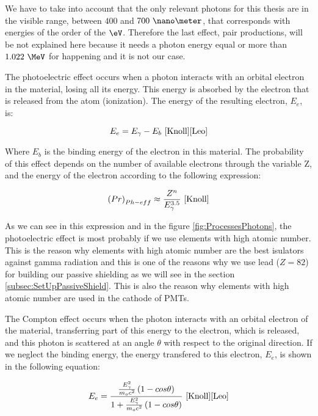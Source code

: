 We have to take into account that the only relevant photons for this thesis are in the visible range, between $400$ and $700~\nano\meter$, that corresponds with energies of the order of the $\eV$. Therefore the last effect, pair productions, will be not explained here because it needs a photon energy equal or more than $1.022~\MeV$ for happening and it is not our case.

The photoelectric effect occurs when a photon interacts with an orbital electron in the material, losing all its energy. This energy is absorbed by the electron that is released from the atom (ionization). The energy of the resulting electron, $E_e$, is:


\begin{equation}
E_e = E_\gamma - E_b ~\cite{Knoll}\cite{Leo}
\label{eq:PhotoelectricEffect}
\end{equation}

Where $E_b$ is the binding energy of the electron in this material. The probability of this effect depends on the number of available electrons through the variable Z, and the energy of the electron according to the following expression:

\begin{equation}
\left(Pr\right)_{Ph-eff} \approx \frac{Z^n}{E_\gamma^{3.5}}~\cite{Knoll}
\label{eq:PhotoelectricProb}
\end{equation}

As we can see in this expression and in the figure \ref{fig:ProcessesPhotons}, the photoelectric effect is most probably if we use elements with high atomic number. This is the reason why elements with high atomic number are the best isulators against gamma radiation and this is one of the reasons why we use lead ($Z=82$) for building our passive shielding as we will see in the section \ref{subsec:SetUpPassiveShield}. This is also the reason why elements with high atomic number are used in the cathode of PMTs. 

The Compton effect occurs when the photon interacts with an orbital electron of the material, transferring part of this energy to the electron, which is released, and this photon is scattered at an angle $\theta$ with respect to the original direction. If we neglect the binding energy, the energy transfered to this electron, $E_e$, is shown in the following equation:

\begin{equation}
E_e=\frac{\frac{E_\gamma^2}{m_oc^2}\left(1-cos\theta\right)}{1+ \frac{E_\gamma^2}{m_oc^2}\left(1-cos\theta\right)}~\cite{Knoll}\cite{Leo}
\label{eq:ComptonEffect}
\end{equation}

